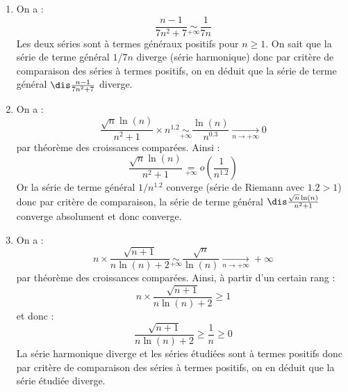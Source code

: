 \documentclass[a4paper,10pt]{report}
\begin{document}
\begin{enumerate}
\item On a :
$$ \frac{n-1}{7n^2+7} \underset{+ \infty}{\sim} \frac{1}{7n}$$
Les deux séries sont à termes généraux positifs pour $n \geq 1$. On sait que la série de terme général $1/7n$ diverge (série harmonique) donc par critère de comparaison des séries à termes positifs, on en déduit que la série de terme général $ \dis\frac{n-1}{7n^2+7}$ diverge.
\item On a :
$$ \frac{\sqrt{n}\ln(n)}{n^2+1} \times n^{1.2} \underset{+ \infty}{\sim}  \frac{\ln(n)}{n^{0.3}} \underset{n \rightarrow + \infty}{\longrightarrow} 0$$
par théorème des croissances comparées. Ainsi :
$$ \frac{\sqrt{n}\ln(n)}{n^2+1} \underset{+\infty}{=} o \left( \frac{1}{n^{1.2}} \right)$$
Or la série de terme général $1/n^{1.2}$ converge (série de Riemann avec $1.2 >1$) donc par critère de comparaison, la série de terme général $\dis\frac{\sqrt{n}\ln(n)}{n^2+1}$ converge absolument et donc converge.
\item On a :
$$ n \times \frac{\sqrt{n+1}}{n\ln(n)+2} \underset{+ \infty}{\sim} \dfrac{\sqrt{n}}{\ln(n)}\underset{n \rightarrow + \infty}{\longrightarrow} + \infty$$
par théorème des croissances comparées. Ainsi, à partir d'un certain rang :
$$ n \times \frac{\sqrt{n+1}}{n\ln(n)+2} \geq 1$$
et donc :
$$ \frac{\sqrt{n+1}}{n\ln(n)+2} \geq \dfrac{1}{n} \geq 0$$
La série harmonique diverge et les séries étudiées sont à termes positifs donc par critère de comparaison des séries à termes positifs, on en déduit que la série étudiée diverge.


\end{enumerate}
\end{document}
